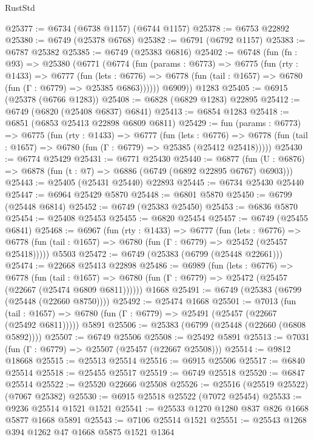 \begin{lexlean}{RustStd}
\begin{coremodule}
@25377 := @6734 (@6738 @1157) (@6744 @1157)
@25378 := @6753 @22892
@25380 := @6749 (@25378 @6768)
@25382 := @6791 (@6792 @1157)
@25383 := @6787 @25382
@25385 := @6749 (@25383 @6816)
@25402 := @6748
    (fun (fn : @93) =>
    @25380
      (@6771
        (@6774
          (fun (params : @6773) =>
          @6775
            (fun (rty : @1433) =>
            @6777
              (fun (lets : @6776) =>
              @6778 (fun (tail : @1657) => @6780 (fun (Γ : @6779) => @25385 @6863))))))
        @6909))
    @1283
@25405 := @6915 (@25378 (@6766 @1283))
@25408 := @6828 (@6829 @1283) @22895
@25412 := @6749 (@6820 (@25408 @6837) @6841)
@25413 := @6854 @1283
@25418 := @6851 (@6853 @25413 @22898 @6809 @6811)
@25429 := fun (params : @6773) =>
  @6775
    (fun (rty : @1433) =>
    @6777
      (fun (lets : @6776) =>
      @6778 (fun (tail : @1657) => @6780 (fun (Γ : @6779) => @25385 (@25412 @25418)))))
@25430 := @6774 @25429
@25431 := @6771 @25430
@25440 := @6877
    (fun (U : @6876) => @6878 (fun (t : @7) => @6886 (@6749 (@6892 @22895 @6767) @6903)))
@25443 := @25405 (@25431 @25440) @22893
@25445 := @6734 @25430 @25440
@25447 := @6964 @25429 @5870
@25448 := @6801 @5870
@25450 := @6799 (@25448 @6814)
@25452 := @6749 (@25383 @25450)
@25453 := @6836 @5870
@25454 := @25408 @25453
@25455 := @6820 @25454
@25457 := @6749 (@25455 @6841)
@25468 := @6967
    (fun (rty : @1433) =>
    @6777
      (fun (lets : @6776) =>
      @6778 (fun (tail : @1657) => @6780 (fun (Γ : @6779) => @25452 (@25457 @25418)))))
    @5503
@25472 := @6749 (@25383 (@6799 (@25448 @22661)))
@25474 := @22668 @25413 @22898
@25486 := @6989
    (fun (lets : @6776) =>
    @6778
      (fun (tail : @1657) =>
      @6780 (fun (Γ : @6779) => @25472 (@25457 (@22667 (@25474 @6809 @6811))))))
    @1668
@25491 := @6749 (@25383 (@6799 (@25448 (@22660 @8750))))
@25492 := @25474 @1668
@25501 := @7013
    (fun (tail : @1657) => @6780 (fun (Γ : @6779) => @25491 (@25457 (@22667 (@25492 @6811)))))
    @5891
@25506 := @25383 (@6799 (@25448 (@22660 (@6808 @5892))))
@25507 := @6749 @25506
@25508 := @25492 @5891
@25513 := @7031 (fun (Γ : @6779) => @25507 (@25457 (@22667 @25508)))
@25514 := @9812 @18668
@25515 := @25513 @25514
@25516 := @6915 @25506
@25517 := @6840 @25514
@25518 := @25455 @25517
@25519 := @6749 @25518
@25520 := @6847 @25514
@25522 := @25520 @22666 @25508
@25526 := @25516 (@25519 @25522) (@7067 @25382)
@25530 := @6915 @25518 @25522 (@7072 @25454)
@25533 := @9236 @25514 @1521 @1521
@25541 := @25533 @1270 @1280 @837 @826 @1668 @5877 @1668 @5891
@25543 := @7106 @25514 @1521
@25551 := @25543 @1268 @394 @1262 @47 @1668 @5875 @1521 @1364

\end{coremodule}
\end{lexlean}
